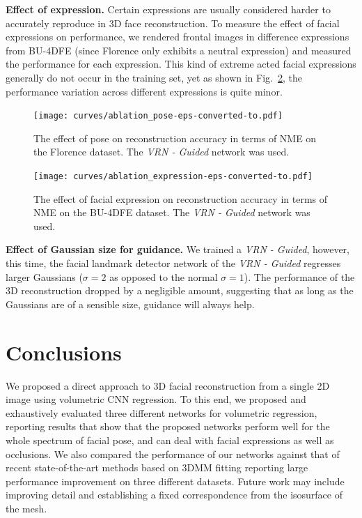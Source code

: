 \textbf{Effect of expression.} Certain expressions are usually considered harder to accurately reproduce in 3D face
reconstruction. To measure the effect of facial expressions on performance, we rendered frontal images in difference expressions from BU-4DFE (since Florence only
exhibits a neutral expression) and measured the performance for each expression. This kind of extreme acted facial
expressions generally do not occur in the training set, yet as shown in Fig.~\ref{fig:effect_expression}, the performance variation across different expressions is quite minor.

\begin{figure}
\centering
  \texttt{[image: curves/ablation\_pose-eps-converted-to.pdf]}
  \caption[Effect of pose]{The effect of pose on reconstruction
    accuracy in terms of NME on the Florence dataset. The \textit{VRN
      - Guided} network was used.}
  \label{fig:effect_pose}
\end{figure}



\begin{figure}
  \centering
  \texttt{[image: curves/ablation\_expression-eps-converted-to.pdf]}
  \caption[Effect of facial expressions]{The effect of facial
    expression on reconstruction accuracy in terms of NME on the
    BU-4DFE dataset. The \textit{VRN - Guided} network was used.}
  \label{fig:effect_expression}
\end{figure}

\textbf{Effect of Gaussian size for guidance.} We trained a
\textit{VRN - Guided}, however, this time, the facial landmark
detector network of the \textit{VRN - Guided} regresses larger
Gaussians ($\sigma = 2$ as opposed to the normal $\sigma = 1$). The
performance of the 3D reconstruction dropped by a negligible amount,
suggesting that as long as the Gaussians are of a sensible size,
guidance will always help.



\section{Conclusions}

We proposed a direct approach to 3D facial reconstruction from a
single 2D image using volumetric CNN regression. To this end, we
proposed and exhaustively evaluated three different networks for
volumetric regression, reporting results that show that the proposed
networks perform well for the whole spectrum of facial pose, and can
deal with facial expressions as well as occlusions. We also compared
the performance of our networks against that of recent
state-of-the-art methods based on 3DMM fitting reporting large
performance improvement on three different datasets.
Future work may include improving detail and establishing a fixed correspondence from the isosurface of the mesh.


